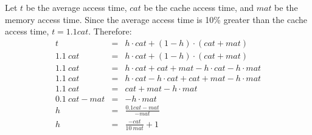 \documentclass[letterpaper,11pt]{article}
\begin{document}
\begin{enumerate}
  Let $t$ be the average access time, $cat$ be the cache access time, and $mat$ be the memory access time.  Since the average access time is 10\% greater than the cache access time, $t = 1.1 cat$.  Therefore:
  \begin{eqnarray*}
    t &=& h\cdot cat + (1 - h)\cdot(cat + mat) \\
    1.1\ cat &=& h\cdot cat + (1 - h)\cdot(cat + mat) \\
    1.1\ cat &=& h\cdot cat + cat + mat - h\cdot cat - h\cdot mat \\
    1.1\ cat &=& h\cdot cat - h\cdot cat + cat + mat - h\cdot mat \\
    1.1\ cat &=& cat + mat - h\cdot mat \\
    0.1\ cat - mat &=& - h\cdot mat \\
    h &=& \frac{0.1 cat - mat}{-mat} \\
    h &=& \frac{-cat}{10\ mat} + 1
  \end{eqnarray*}
\end{enumerate}
\end{document}
